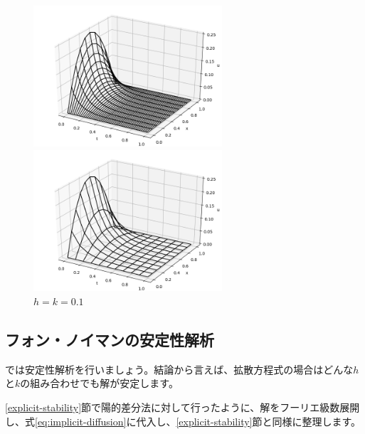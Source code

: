 \begin{figure}[ht!]
 \begin{minipage}{0.45\hsize}
  \begin{center}
   \includegraphics[width=7cm]{img/5-stability3.png}
  \end{center}
  \caption{$h=0.0052,k=0.1$}
  \label{fig:stability-3}
 \end{minipage}
 \begin{minipage}{0.5\hsize}
  \begin{center}
   \includegraphics[width=7cm]{img/5-stability4.png}
  \end{center}
  \caption{$h=k=0.1$}
  \label{fig:stability-4}
 \end{minipage}
\end{figure}








\subsection{フォン・ノイマンの安定性解析}
\label{implicit-stability}
では安定性解析を行いましょう。結論から言えば、拡散方程式の場合はどんな$h$と$k$の組み合わせでも解が安定します。

\ref{explicit-stability}節で陽的差分法に対して行ったように、解をフーリエ級数展開し、式\ref{eq:implicit-diffusion}に代入し、\ref{explicit-stability}節と同様に整理します。

